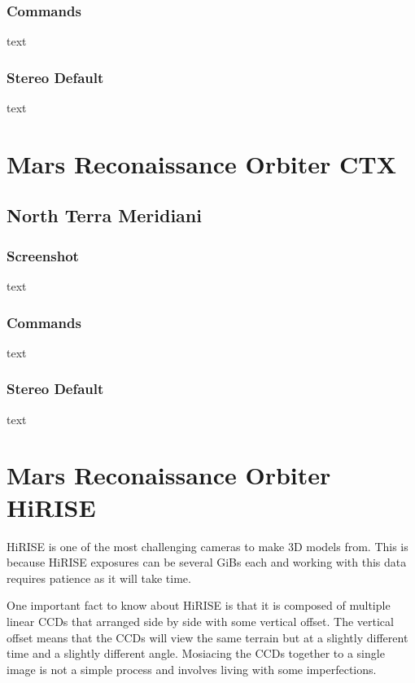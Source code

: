 \subsubsection*{Commands}

text

\subsubsection*{Stereo Default}

text

\section{Mars Reconaissance Orbiter CTX}

\subsection{North Terra Meridiani}

\subsubsection*{Screenshot}

text

\subsubsection*{Commands}

text

\subsubsection*{Stereo Default}

text

\section{Mars Reconaissance Orbiter HiRISE}

HiRISE is one of the most challenging cameras to make 3D models
from. This is because HiRISE exposures can be several GiBs each and
working with this data requires patience as it will take time.

One important fact to know about HiRISE is that it is composed of
multiple linear CCDs that arranged side by side with some vertical
offset. The vertical offset means that the CCDs will view the same
terrain but at a slightly different time and a slightly different
angle. Mosiacing the CCDs together to a single image is not a simple
process and involves living with some imperfections.

